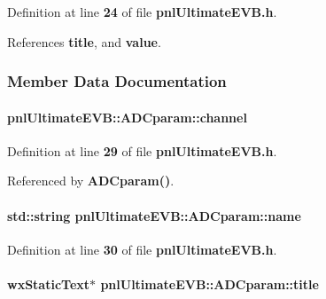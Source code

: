 Definition at line {\bf 24} of file {\bf pnl\+Ultimate\+E\+V\+B.\+h}.



References {\bf title}, and {\bf value}.



\subsubsection{Member Data Documentation}
\paragraph[{channel}]{ pnl\+Ultimate\+E\+V\+B\+::\+A\+D\+Cparam\+::channel}\label{classpnlUltimateEVB_1_1ADCparam_aa1f5b39933072b5347e0c7e9bc66b86f}


Definition at line {\bf 29} of file {\bf pnl\+Ultimate\+E\+V\+B.\+h}.



Referenced by {\bf A\+D\+Cparam()}.

\paragraph[{name}]{\setlength{\rightskip}{0pt plus 5cm}std\+::string pnl\+Ultimate\+E\+V\+B\+::\+A\+D\+Cparam\+::name}\label{classpnlUltimateEVB_1_1ADCparam_a6c544f8fdded0fad0ff40bbc2eede5c0}


Definition at line {\bf 30} of file {\bf pnl\+Ultimate\+E\+V\+B.\+h}.

\paragraph[{title}]{\setlength{\rightskip}{0pt plus 5cm}wx\+Static\+Text$\ast$ pnl\+Ultimate\+E\+V\+B\+::\+A\+D\+Cparam\+::title}\label{classpnlUltimateEVB_1_1ADCparam_ab7e3df94b8d4ef39f4805bc89918a376}


